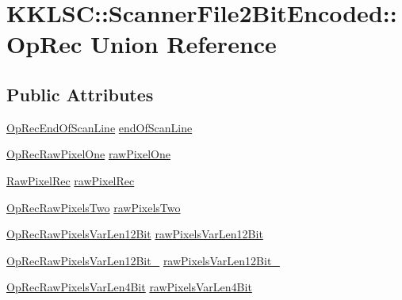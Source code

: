 \hypertarget{union_scanner_file2_bit_encoded_1_1_op_rec}{}\section{K\+K\+L\+SC\+:\+:Scanner\+File2\+Bit\+Encoded\+:\+:Op\+Rec Union Reference}
\label{union_scanner_file2_bit_encoded_1_1_op_rec}
\subsection*{Public Attributes}
\begin{DoxyCompactItemize}
\item 
\hyperlink{struct_scanner_file2_bit_encoded_1_1_op_rec_end_of_scan_line}{Op\+Rec\+End\+Of\+Scan\+Line} \hyperlink{union_scanner_file2_bit_encoded_1_1_op_rec_af78b211aa9eb5538eac7b79cc4ab9908}{end\+Of\+Scan\+Line}
\item 
\hyperlink{struct_scanner_file2_bit_encoded_1_1_op_rec_raw_pixel_one}{Op\+Rec\+Raw\+Pixel\+One} \hyperlink{union_scanner_file2_bit_encoded_1_1_op_rec_ac58f69139f0ffc319da6dcd6ee8f9531}{raw\+Pixel\+One}
\item 
\hyperlink{struct_scanner_file2_bit_encoded_1_1_raw_pixel_rec}{Raw\+Pixel\+Rec} \hyperlink{union_scanner_file2_bit_encoded_1_1_op_rec_ac8cbe5c044e1fda7986f35569f489a3d}{raw\+Pixel\+Rec}
\item 
\hyperlink{struct_scanner_file2_bit_encoded_1_1_op_rec_raw_pixels_two}{Op\+Rec\+Raw\+Pixels\+Two} \hyperlink{union_scanner_file2_bit_encoded_1_1_op_rec_acaf907b6739335ba2abd174fc071318a}{raw\+Pixels\+Two}
\item 
\hyperlink{struct_scanner_file2_bit_encoded_1_1_op_rec_raw_pixels_var_len12_bit}{Op\+Rec\+Raw\+Pixels\+Var\+Len12\+Bit} \hyperlink{union_scanner_file2_bit_encoded_1_1_op_rec_a50dd820d33b64096015f303f5a1fb75c}{raw\+Pixels\+Var\+Len12\+Bit}
\item 
\hyperlink{struct_scanner_file2_bit_encoded_1_1_op_rec_raw_pixels_var_len12_bit__2}{Op\+Rec\+Raw\+Pixels\+Var\+Len12\+Bit\+\_} \hyperlink{union_scanner_file2_bit_encoded_1_1_op_rec_a6af927af03cb1051bb579803525c9bfd}{raw\+Pixels\+Var\+Len12\+Bit\+\_}
\item 
\hyperlink{struct_scanner_file2_bit_encoded_1_1_op_rec_raw_pixels_var_len4_bit}{Op\+Rec\+Raw\+Pixels\+Var\+Len4\+Bit} \hyperlink{union_scanner_file2_bit_encoded_1_1_op_rec_abd772a278b13d3d402b00dbd3c78d60d}{raw\+Pixels\+Var\+Len4\+Bit}

\end{DoxyCompactItemize}
